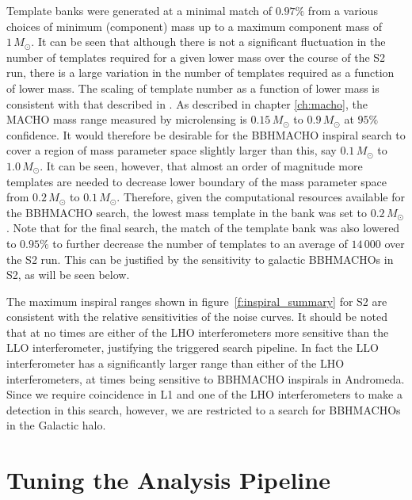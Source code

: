 Template banks were generated at a minimal match of $0.97\%$ from a various
choices of minimum (component) mass up to a maximum component mass of
$1\,M_\odot$. It can be seen that although there is not a significant
fluctuation in the number of templates required for a given lower mass over
the course of the S2 run, there is a large variation in the number of
templates required as a function of lower mass. The scaling of template number
as a function of lower mass is consistent with that described in
\cite{Owen:1998dk}. As described in chapter \ref{ch:macho}, the MACHO mass
range measured by microlensing is $0.15\,M_\odot$ to $0.9\,M_\odot$ at $95\%$
confidence. It would therefore be desirable for the BBHMACHO inspiral search
to cover a region of mass parameter space slightly larger than this, say
$0.1\,M_\odot$ to $1.0\,M_\odot$.  It can be seen, however, that almost an
order of magnitude more templates are needed to decrease lower boundary of
the mass parameter space from $0.2\,M_\odot$ to $0.1\,M_\odot$.  Therefore,
given the computational resources available for the BBHMACHO search, the
lowest mass template in the bank was set to $0.2\,M_\odot$. Note that for the
final search, the match of the template bank was also lowered to $0.95\%$ to
further decrease the number of templates to an average of $14\,000$ over the
S2 run. This can be justified by the sensitivity to galactic BBHMACHOs in S2,
as will be seen below.

The maximum inspiral ranges shown in figure~\ref{f:inspiral_summary} for S2
are consistent with the relative sensitivities of the noise curves. It should
be noted that at no times are either of the LHO interferometers more sensitive
than the LLO interferometer, justifying the triggered search pipeline. In fact
the LLO interferometer has a significantly larger range than either of the LHO
interferometers, at times being sensitive to BBHMACHO inspirals in Andromeda.
Since we require coincidence in L1 and one of the LHO interferometers to make
a detection in this search, however, we are restricted to a search for
BBHMACHOs in the Galactic halo.  

\section{Tuning the Analysis Pipeline}
\label{s:s2tuning}

